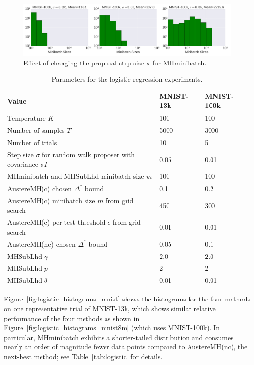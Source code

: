 \documentclass[letterpaper]{article}
\newcommand\T{\rule{0pt}{2.6ex}}       %
\begin{document}
\begin{figure}[t]
	\centering
    \includegraphics[width=0.9\linewidth]{logistic_regression_step_size_tests.png}
	\caption{
    Effect of changing the proposal step size $\sigma$ for
    {\sc MHminibatch}.
    }
	\label{fig:logistic_histograms_appendix}
\end{figure}

\begin{table}[t]
\caption{Parameters for the logistic regression experiments.}
\small
\label{tab:logistic_settings}
\vskip 0.15in
\begin{center}
\begin{tabular}{l l l}
\textbf{Value} & \textbf{MNIST-13k} & \textbf{MNIST-100k} \\
\hline
\T Temperature $K$       & 100 & 100 \\
Number of samples $T$ & 5000 & 3000 \\
Number of trials      & 10 & 5 \\
Step size $\sigma$ for random walk proposer with covariance $\sigma I$ & 0.05 & 0.01 \\
{\sc MHminibatch} and {\sc MHSubLhd} minibatch size $m$ & 100 & 100 \\
{\sc AustereMH(c)} chosen $\Delta^*$ bound & 0.1 & 0.2 \\
{\sc AustereMH(c)} minibatch size $m$ from grid search & 450 & 300 \\
{\sc AustereMH(c)} per-test threshold $\epsilon$ from grid search & 0.01 & 0.01\\
{\sc AustereMH(nc)} chosen $\Delta^*$ bound & 0.05 & 0.1 \\
{\sc MHSubLhd} $\gamma$ & 2.0  & 2.0  \\
{\sc MHSubLhd} $p$      & 2 & 2 \\
{\sc MHSubLhd} $\delta$ & 0.01 & 0.01 \\
\end{tabular}
\end{center}
\vskip -0.1in
\end{table}

Figure~\ref{fig:logistic_histograms_mnist} shows the histograms for the four
methods on one representative trial of MNIST-13k, which shows similar relative
performance of the four methods as shown in
Figure~\ref{fig:logistic_histograms_mnist8m} (which uses MNIST-100k). In
particular, {\sc MHminibatch} exhibits a shorter-tailed distribution and
consumes nearly an order of magnitude fewer data points compared to {\sc
AustereMH(nc)}, the next-best method; see Table~\ref{tab:logistic} for details.
\end{document}
